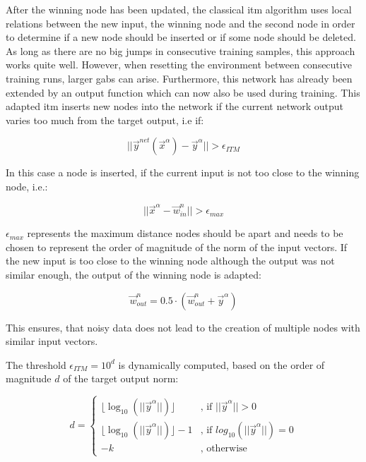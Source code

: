 After the winning node has been updated, the classical \gls{itm} algorithm uses local relations between the new input, the winning node and the second node in order to determine if a new node should be inserted or if some node should be deleted. As long as there are no big jumps in consecutive training samples, this approach works quite well. However, when resetting the environment between consecutive training runs, larger gabs can arise. Furthermore, this network has already been extended by an output function which can now also be used during training. This adapted \gls{itm} inserts new nodes into the network if the current network output varies too much from the target output, i.e if:

\begin{equation}
||\vec{y}^{net}(\vec{x}^\alpha)-\vec{y}^\alpha|| > \epsilon_{ITM}
\end{equation}

In this case a node is inserted, if the current input is not too close to the winning node, i.e.:

\begin{equation}
||\vec{x}^\alpha - \vec{w}^n_{in}|| > \epsilon_{max}
\end{equation}

$\epsilon_{max}$ represents the maximum distance nodes should be apart and needs to be chosen to represent the order of magnitude of the norm of the input vectors.
If the new input is too close to the winning node although the output was not similar enough, the output of the winning node is adapted:

\begin{equation}
\vec{w}^n_{out} = 0.5 \cdot (\vec{w}^n_{out} + \vec{y}^\alpha)
\end{equation}

This ensures, that noisy data does not lead to the creation of multiple nodes with similar input vectors. 

The threshold $\epsilon_{ITM} = 10^d$ is dynamically computed, based on the order of magnitude $d$ of the target output norm: %

\begin{equation}
d = \begin{cases}
\lfloor\log_{10}(||\vec{y}^\alpha||)\rfloor & \text{, if $||\vec{y}^\alpha|| > 0$} \\
\lfloor\log_{10}(||\vec{y}^\alpha||)\rfloor-1 & \text{, if $log_{10}(||\vec{y}^\alpha||) = 0$} \\
-k & \text{, otherwise}
\end{cases}
\end{equation}

